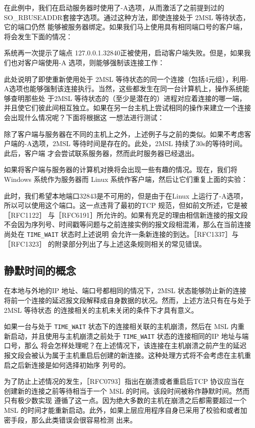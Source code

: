 在此例中，我们在启动服务器时使用了-A选项，从而激活了之前提到过的SO\_RBUSEADDR套接字选项。通过这种方法，即使连接处于 2MSL 等待状态，它的端口仍然
能够被服务器绑定。如果我们马上使用具有相同端口号的客户端，将会发生下面的情况：

系统再一次提示了端点 127.0.0.1.32840正被使用，启动客户端失败。但是，如果我们也对客户端使用-A 选项，则能够强制该连接工作：

此处说明了即使重新使用处于 2MSL 等待状态的同一个连接（包括4元组），利用-A选项也能够强制该连接执行。当然，这些都发生在同一台计算机上，操作系统能够查明那些处
于2MSL 等待状态的（至少是潜在的）进程对应着连接的哪一端，并且使它们彼此间相互独立。如果在另一台主机上尝试相同的操作来建立一个连接会出现什么情况呢？下面将根据这
一想法进行测试：

除了客户端与服务器在不同的主机上之外，上述例子与之前的类似。如果不考虑客户端的-A选项，2MSL 等待时间是存在的。此处，2MSL 持续了30s的等待时间。此后，客户端
才会尝试联系服务器，然而此时服务器已经退出。

如果将客户端与服务器的计算机对换将会出现一些有趣的情况。现在，我们将 Windows
系统作为服务器而 Linux 系统作客户端，然后让它们重复上面的实验：

此时，我们希望本地端口32843是不可用的，但是由于在Linux 上运行了-A选项，所以可以使用这个端口。这一点违背了最初的TCP 规范，但如前文所述，它是被［RFC1122］
与［RFC6191］所允许的。如果有充足的理由相信新连接的报文段不会因为序列号、时间戳等问题与之前连接实例的报文段相混淆，那么在当前连接尚处在 \verb|TIME_WAIT| 状态时上述说明
会允许一条新连接的到达。［RFC1337］与［RFC1323］ 的附录部分列出了与上述这条规则相关的常见错误。
\subsection{静默时间的概念}
在本地与外地的IP 地址、端口号都相同的情况下，2MSL 状态能够防止新的连接将前一个连接的延迟报文段解释成自身数据的状况。然而，上述方法只有在与处于 2MSL 等待状态
的连接相关的主机未关闭的条件下才具有意义。

如果一台与处于 \verb|TIME_WAIT| 状态下的连接相关联的主机崩溃，然后在 MSL 内重新启动，并且使用与主机崩溃之前处于 \verb|TIME_WAIT| 状态的连接相同的IP 地址与端口号，那么
将会怎样处理呢？在上述情况下，该连接在主机崩溃之前产生的延迟报文段会被认为属于主机重启后创建的新连接。这种处理方式将不会考虑在主机重启之后新连接是如何选择初始序
列号的。

为了防止上述情况的发生，［RFC0793］指出在崩溃或者重启后TCP 协议应当在创建新的连接之前等待相当于一个 MSL 的时间。该段时间被称作静默时间。然而只有极少数实现
遵循了这一点。因为绝大多数的主机在崩溃之后都需要超过一个 MSL 的时间才能重新启动。此外，如果上层应用程序自身已采用了校验和或者加密手段，那么此类错误会很容易检测
出来。
